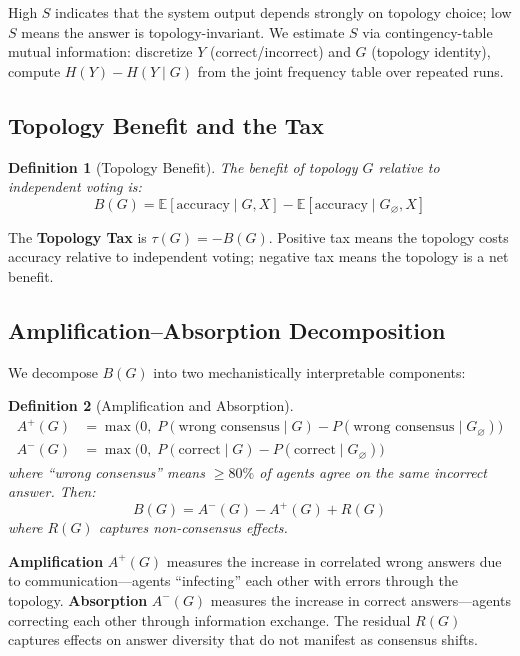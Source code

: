 \documentclass{article}
\newtheorem{definition}{Definition}
\begin{document}
High $S$ indicates that the system output depends strongly on topology choice; low $S$ means the answer is topology-invariant. We estimate $S$ via contingency-table mutual information: discretize $Y$ (correct/incorrect) and $G$ (topology identity), compute $H(Y) - H(Y \mid G)$ from the joint frequency table over repeated runs.

\subsection{Topology Benefit and the Tax}

\begin{definition}[Topology Benefit]
\label{def:benefit}
The benefit of topology $G$ relative to independent voting is:
\begin{equation}
    B(G) = \mathbb{E}[\text{accuracy} \mid G, X] - \mathbb{E}[\text{accuracy} \mid G_\varnothing, X]
\end{equation}
\end{definition}

The \textbf{Topology Tax} is $\tau(G) = -B(G)$. Positive tax means the topology costs accuracy relative to independent voting; negative tax means the topology is a net benefit.

\subsection{Amplification--Absorption Decomposition}

We decompose $B(G)$ into two mechanistically interpretable components:

\begin{definition}[Amplification and Absorption]
\label{def:amp-abs}
\begin{align}
    A^+(G) &= \max\bigl(0,\; P(\text{wrong consensus} \mid G) - P(\text{wrong consensus} \mid G_\varnothing)\bigr) \\
    A^-(G) &= \max\bigl(0,\; P(\text{correct} \mid G) - P(\text{correct} \mid G_\varnothing)\bigr)
\end{align}
where ``wrong consensus'' means $\geq 80\%$ of agents agree on the same incorrect answer. Then:
\begin{equation}
    B(G) = A^-(G) - A^+(G) + R(G)
\end{equation}
where $R(G)$ captures non-consensus effects.
\end{definition}

\textbf{Amplification} $A^+(G)$ measures the increase in correlated wrong answers due to communication---agents ``infecting'' each other with errors through the topology. \textbf{Absorption} $A^-(G)$ measures the increase in correct answers---agents correcting each other through information exchange. The residual $R(G)$ captures effects on answer diversity that do not manifest as consensus shifts.
\end{document}
